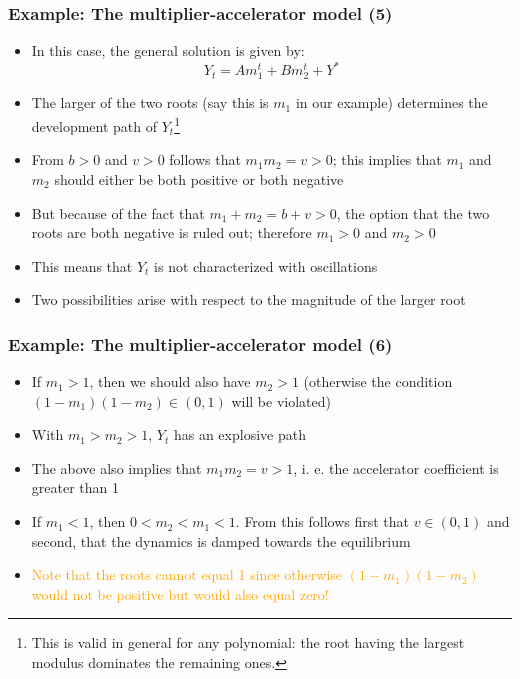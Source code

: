 \documentclass[10pt,usenames,dvipsnames]{beamer}
\theoremstyle{definition}
\begin{document}
\begin{frame}[fragile]
\frametitle{Example: The multiplier-accelerator model (5)}
\begin{itemize}
	\item In this case, the general solution is given by:
	\[
		Y_{t} = Am_{1}^{t} + Bm_{2}^{t} + Y^{*}
	\]
	\item The larger of the two roots (say this is $m_{1}$ in our example) determines the development path of $Y_{t}$\footnote{This is valid in general for any polynomial: the root having the largest modulus dominates the remaining ones.}
	\item From $b > 0$ and $v > 0$ follows that $m_{1}m_{2} = v > 0$; this implies that $m_{1}$ and $m_{2}$ should either be both positive or both negative
	\item But because of the fact that $m_{1} + m_{2} = b + v > 0$, the option that the two roots are both negative is ruled out; therefore $m_{1} > 0$ and $m_{2} > 0$
	\item This means that $Y_{t}$ is not characterized with oscillations
	\item Two possibilities arise with respect to the magnitude of the larger root 
\end{itemize}
\end{frame}

\begin{frame}[fragile]
\frametitle{Example: The multiplier-accelerator model (6)}
\begin{itemize}
	\item If \textcolor{mygreen1}{$m_{1} > 1$}, then we should also have $m_{2} > 1$ (otherwise the condition $(1 - m_{1})(1 - m_{2}) \in (0,1)$ will be violated)
	\item With $m_{1} > m_{2} > 1$, $Y_{t}$ has an explosive path
	\item The above also implies that $m_{1}m_{2} = v > 1$, i. e. the accelerator coefficient is greater than 1
	\item If \textcolor{mygreen1}{$m_{1} < 1$}, then $0 < m_{2} < m_{1} < 1$. From this follows first that $v \in (0,1)$ and second, that the dynamics is damped towards the equilibrium
	\item \textcolor{orange}{Note that the roots cannot equal 1 since otherwise $(1 - m_{1})(1 - m_{2})$ would not be positive but would also equal zero!}
\end{itemize}
\end{frame}
\end{document}
